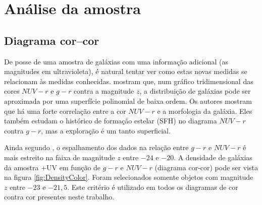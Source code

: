 



\chapter{Análise da amostra \STARLIGHTUV}
\label{sec:Analise}



\section{Diagrama cor--cor}

De posse de uma amostra de galáxias com uma informação adicional (as magnitudes
em ultravioleta), é natural tentar ver como estas novas medidas se relacionam às
medidas conhecidas. \citet{Chilingarian2011} mostram que, num gráfico
tridimensional das cores $NUV-r$ e $g-r$ contra a magnitude $z$, a distribuição
de galáxias pode ser aproximada por uma superfície polinomial de baixa ordem. Os
autores mostram que há uma forte correlação entre a cor $NUV-r$ e a morfologia
da galáxia. Eles também estudam o histórico de formação estelar (SFH) no
diagrama $NUV-r$ contra $g-r$, mas a exploração é um tanto superficial.

Ainda segundo \citet[figura 1, exemplo na figura 4]{Chilingarian2011}, o
espalhamento dos dados na relação entre $g-r$ e $NUV-r$ é mais estreito na faixa
de magnitude $z$ entre $-24$ e $-20$. A densidade de galáxias da amostra
\starlight+UV em função de $g-r$ e $NUV-r$ (diagrama cor-cor) pode ser vista na
figura \ref{fig:DensityColor}. Foram selecionados somente objetos com magnitude
$z$ entre $-23$ e $-21,5$. Este critério é utilizado em todos os diagramas de
cor contra cor presentes neste trabalho.

